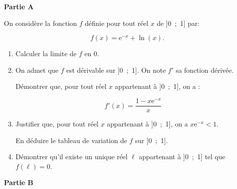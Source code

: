 \medskip

\textbf{Partie A}

\medskip

On considère la fonction $f$ définie pour tout réel $x$ de ]0~;~1] par:

\[f(x) = \text{e}^{-x} + \ln (x).\]

\smallskip

\begin{enumerate}
\item Calculer la limite de $f$ en $0$.
\item On admet que $f$ est dérivable sur ]0~;~1]. On note $f'$ sa fonction dérivée.

Démontrer que, pour tout réel $x$ appartenant à ]0~;~1], on a :

\[f'(x) = \dfrac{1 - x\text{e}^{-x}}{x}\]

\item Justifier que, pour tout réel $x$ appartenant à ]0~;~1], on a $x\text{e}^{-x} < 1$.

En déduire le tableau de variation de $f$ sur ]0~;~1].
\item Démontrer qu'il existe un unique réel $\ell$ appartenant à ]0~;~1] tel que $f(\ell) = 0$.
\end{enumerate}

\medskip

\textbf{Partie B}

\medskip

